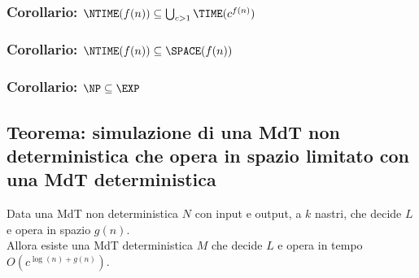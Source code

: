 \subsubsection{Corollario: $\NTIME(f(n)) \subseteq \bigcup_{c>1} \TIME(c^{f(n)})$}
\subsubsection{Corollario: $\NTIME(f(n)) \subseteq \SPACE(f(n))$}
\subsubsection{Corollario: $\NP \subseteq \EXP$}


\subsection{Teorema: simulazione di una MdT non deterministica che opera in spazio limitato con una MdT deterministica}
Data una MdT non deterministica $N$ con input e output, a $k$ nastri,
che decide $L$ e opera in spazio $g(n)$. \\
Allora esiste una MdT deterministica $M$ 
che decide $L$ e opera in tempo $O(c^{\log(n) + g(n)})$.
